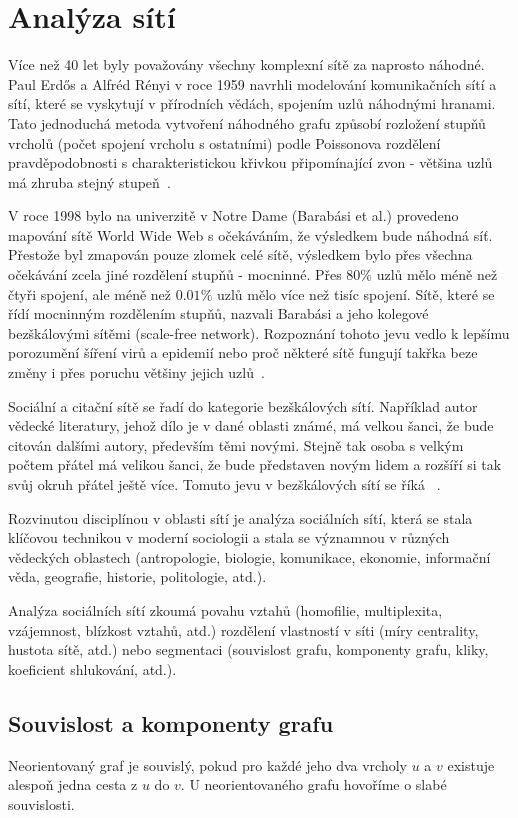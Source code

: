 \documentclass{bakalarka}
\begin{document}
\chapter{Analýza sítí}
Více než 40 let byly považovány všechny komplexní sítě za naprosto náhodné.
Paul Erdős a Alfréd Rényi v roce 1959 navrhli modelování komunikačních sítí a
sítí, které se vyskytují v přírodních vědách, spojením uzlů náhodnými hranami.
Tato jednoduchá metoda vytvoření náhodného grafu způsobí rozložení stupňů
vrcholů (počet spojení vrcholu s ostatními) podle Poissonova rozdělení
pravděpodobnosti s charakteristickou křivkou připomínající zvon - většina uzlů
má zhruba stejný stupeň~\citep{barabasi2005,barabasibonabeau2003}.

V roce 1998 bylo na univerzitě v Notre Dame (Barabási et al.) provedeno
mapování sítě World Wide Web s očekáváním, že výsledkem bude náhodná síť.
Přestože byl zmapován pouze zlomek celé sítě, výsledkem bylo přes všechna
očekávání zcela jiné rozdělení stupňů - mocninné. Přes $80\%$ uzlů mělo méně
než čtyři spojení, ale méně než $0.01\%$ uzlů mělo více než tisíc spojení.
Sítě, které se řídí mocninným rozdělením stupňů, nazvali Barabási a jeho
kolegové bezškálovými sítěmi (scale-free network). Rozpoznání tohoto jevu vedlo
k lepšímu porozumění šíření virů a epidemií nebo proč některé sítě fungují
takřka beze změny i přes poruchu většiny jejich
uzlů~\citep{barabasibonabeau2003}.  

Sociální a citační sítě se řadí do kategorie bezškálových sítí. Například autor
vědecké literatury, jehož dílo je v dané oblasti známé, má velkou šanci, že
bude citován dalšími autory, především těmi novými. Stejně tak osoba s velkým
počtem přátel má velikou šanci, že bude představen novým lidem a rozšíří si tak
svůj okruh přátel ještě více. Tomuto jevu v bezškálových sítí se říká
~\citep{barabasibonabeau2003}.

Rozvinutou disciplínou v oblasti sítí je analýza sociálních sítí, která se
stala klíčovou technikou v moderní sociologii a stala se významnou v různých
vědeckých oblastech (antropologie, biologie, komunikace, ekonomie, informační
věda, geografie, historie, politologie, atd.).

Analýza sociálních sítí zkoumá povahu vztahů (homofilie, multiplexita,
vzájemnost, blízkost vztahů, atd.) rozdělení vlastností v síti (míry
centrality, hustota sítě, atd.) nebo segmentaci (souvislost grafu, komponenty
grafu, kliky, koeficient shlukování, atd.).

\section{Souvislost a komponenty grafu}
Neorientovaný graf je souvislý, pokud pro každé jeho dva vrcholy $u$ a $v$
existuje alespoň jedna cesta z $u$ do $v$. U neorientovaného grafu hovoříme o
slabé souvislosti. 
\end{document}
